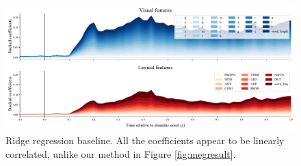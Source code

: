 \begin{figure}
  \centering
  \includegraphics[width=\textwidth, trim=0cm 0cm 0cm 0cm, clip=True]{figures/ridgecv_baseline_result.pdf}
  \caption{Ridge regression baseline. All the coefficients appear to be
  linearly correlated, unlike our method in Figure \ref{fig:megresult}.}
  \label{fig:ridgebaselineresult}
\end{figure}

